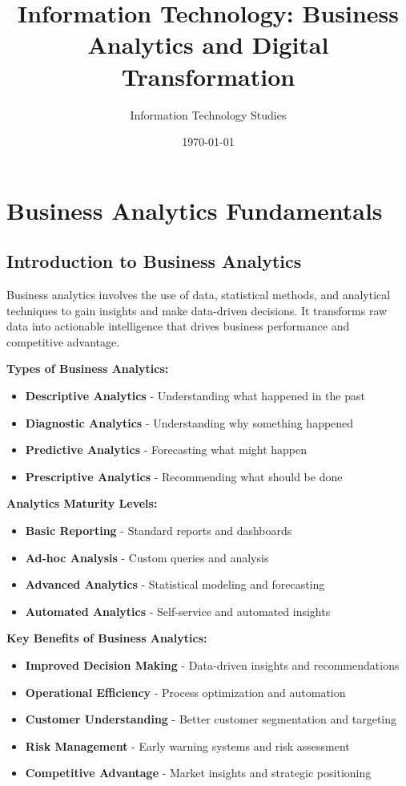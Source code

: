 \documentclass[12pt]{article}
\title{Information Technology: Business Analytics and Digital Transformation}
\author{Information Technology Studies}
\date{\today}
\begin{document}
\maketitle

\section{Business Analytics Fundamentals}

\subsection{Introduction to Business Analytics}
Business analytics involves the use of data, statistical methods, and analytical techniques to gain insights and make data-driven decisions. It transforms raw data into actionable intelligence that drives business performance and competitive advantage.

\textbf{Types of Business Analytics:}
\begin{itemize}
    \item \textbf{Descriptive Analytics} - Understanding what happened in the past
    \item \textbf{Diagnostic Analytics} - Understanding why something happened
    \item \textbf{Predictive Analytics} - Forecasting what might happen
    \item \textbf{Prescriptive Analytics} - Recommending what should be done
\end{itemize}

\textbf{Analytics Maturity Levels:}
\begin{itemize}
    \item \textbf{Basic Reporting} - Standard reports and dashboards
    \item \textbf{Ad-hoc Analysis} - Custom queries and analysis
    \item \textbf{Advanced Analytics} - Statistical modeling and forecasting
    \item \textbf{Automated Analytics} - Self-service and automated insights
\end{itemize}

\textbf{Key Benefits of Business Analytics:}
\begin{itemize}
    \item \textbf{Improved Decision Making} - Data-driven insights and recommendations
    \item \textbf{Operational Efficiency} - Process optimization and automation
    \item \textbf{Customer Understanding} - Better customer segmentation and targeting
    \item \textbf{Risk Management} - Early warning systems and risk assessment
    \item \textbf{Competitive Advantage} - Market insights and strategic positioning
\end{itemize}
\end{document}
